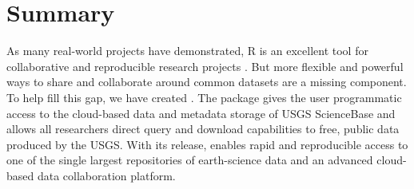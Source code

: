 \section{Summary}

As many real-world projects have demonstrated, R is
an excellent tool for collaborative and reproducible
research projects \citep{Gandrud213}. But more flexible and powerful
ways to share and collaborate around common datasets
are a missing component. To help fill this gap, we
have created . The  package
gives the user programmatic access to the
cloud-based data and metadata storage of USGS ScienceBase
and allows all researchers direct query and download
capabilities to free, public data produced by the USGS.
With its release,  enables rapid and reproducible
access to one of the single
largest repositories of earth-science data and an advanced
cloud-based data collaboration platform.
